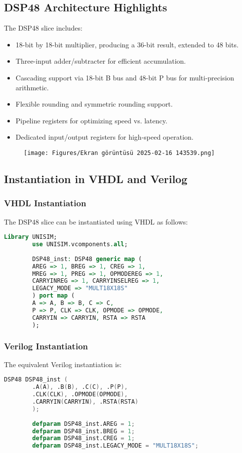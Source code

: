 \documentclass{article}
\begin{document}
	\subsection{DSP48 Architecture Highlights}
	The DSP48 slice includes:
	\begin{itemize}
		\item 18-bit by 18-bit multiplier, producing a 36-bit result, extended to 48 bits.
		\item Three-input adder/subtracter for efficient accumulation.
		\item Cascading support via 18-bit B bus and 48-bit P bus for multi-precision arithmetic.
		\item Flexible rounding and symmetric rounding support.
		\item Pipeline registers for optimizing speed vs. latency.
		\item Dedicated input/output registers for high-speed operation.
	\end{itemize}
	\newpage
	
	\begin{figure}
		\centering
		\texttt{[image: Figures/Ekran görüntüsü 2025-02-16 143539.png]}
		\label{fig:enter-label}
	\end{figure}
	
	
	\subsection{Instantiation in VHDL and Verilog}
	\subsubsection{VHDL Instantiation}
	The DSP48 slice can be instantiated using VHDL as follows:
	\begin{lstlisting}[language=VHDL]
		Library UNISIM;
		use UNISIM.vcomponents.all;
		
		DSP48_inst: DSP48 generic map (
		AREG => 1, BREG => 1, CREG => 1,
		MREG => 1, PREG => 1, OPMODEREG => 1,
		CARRYINREG => 1, CARRYINSELREG => 1,
		LEGACY_MODE => "MULT18X18S"
		) port map (
		A => A, B => B, C => C,
		P => P, CLK => CLK, OPMODE => OPMODE,
		CARRYIN => CARRYIN, RSTA => RSTA
		);
	\end{lstlisting}
	
	\subsubsection{Verilog Instantiation}
	The equivalent Verilog instantiation is:
	\begin{lstlisting}[language=Verilog]
		DSP48 DSP48_inst (
		.A(A), .B(B), .C(C), .P(P),
		.CLK(CLK), .OPMODE(OPMODE),
		.CARRYIN(CARRYIN), .RSTA(RSTA)
		);
		
		defparam DSP48_inst.AREG = 1;
		defparam DSP48_inst.BREG = 1;
		defparam DSP48_inst.CREG = 1;
		defparam DSP48_inst.LEGACY_MODE = "MULT18X18S";
	\end{lstlisting}
	
\end{document}
